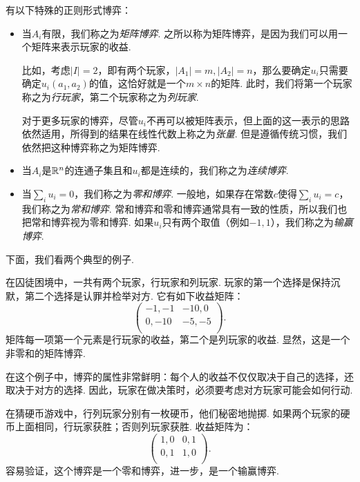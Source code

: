 有以下特殊的正则形式博弈：
\begin{itemize}
    \item 当$A_i$有限，我们称之为\textit{矩阵博弈}. 之所以称为矩阵博弈，是因为我们可以用一个矩阵来表示玩家的收益. 
    
    比如，考虑$|I|=2$，即有两个玩家，$|A_1|=m,|A_2|=n$，那么要确定$u_i$只需要确定$u_i(a_1,a_2)$的值，这恰好就是一个$m\times n$的矩阵. 此时，我们将第一个玩家称之为\textit{行玩家}，第二个玩家称之为\textit{列玩家}.

    对于更多玩家的博弈，尽管$u_i$不再可以被矩阵表示，但上面的这一表示的思路依然适用，所得到的结果在线性代数上称之为\textit{张量}. 但是遵循传统习惯，我们依然把这种博弈称之为矩阵博弈.

    \item 当$A_i$是$\mathbb{R}^n$的连通子集且和$u_i$都是连续的，我们称之为\textit{连续博弈}.
    \item 当$\sum_i u_i=0$，我们称之为\textit{零和博弈}. 一般地，如果存在常数$c$使得$\sum_i u_i=c$，我们称之为\textit{常和博弈}. 常和博弈和零和博弈通常具有一致的性质，所以我们也把常和博弈视为零和博弈. 如果$u_i$只有两个取值（例如$-1,1$），我们称之为\textit{输赢博弈}.
\end{itemize}

下面，我们看两个典型的例子. 

\begin{example}[囚徒困境]\label{example:prisoner}
在囚徒困境中，一共有两个玩家，行玩家和列玩家. 玩家的第一个选择是保持沉默，第二个选择是认罪并检举对方. 它有如下收益矩阵：
\[
\begin{pmatrix}
-1,-1&-10,0\\
0,-10&-5,-5\\
\end{pmatrix}.
\]
矩阵每一项第一个元素是行玩家的收益，第二个是列玩家的收益. 显然，这是一个非零和的矩阵博弈. 

在这个例子中，博弈的属性非常鲜明：每个人的收益不仅仅取决于自己的选择，还取决于对方的选择. 因此，玩家在做决策时，必须要考虑对方玩家可能会如何行动. 
\end{example}

\begin{example}[猜硬币游戏]\label{example:matching-pennies}
在猜硬币游戏中，行列玩家分别有一枚硬币，他们秘密地抛掷. 如果两个玩家的硬币上面相同，行玩家获胜；否则列玩家获胜. 收益矩阵为：
    \[
    \begin{pmatrix}
    1,0&0,1\\
    0,1&1,0\\
    \end{pmatrix}.
    \]
容易验证，这个博弈是一个零和博弈，进一步，是一个输赢博弈.
\end{example}

